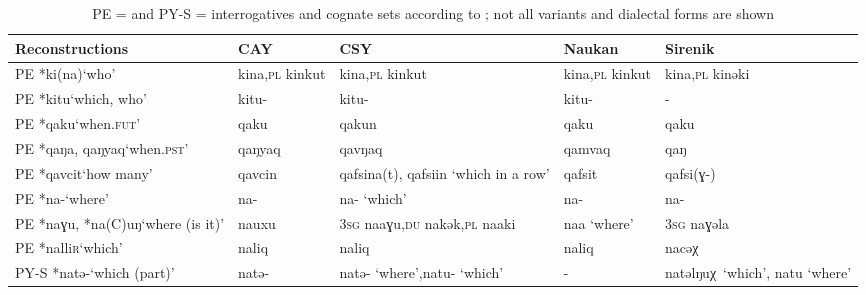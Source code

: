 \begin{table}
\caption{PE =  and PY-S =  interrogatives and cognate sets according to \cite[97, 98, 190, 223, 304, 310, 318]{FortescueJacobsonKaplan2010}; not all variants and dialectal forms are shown}
\label{tab:eska:7}

\begin{tabularx}{\textwidth}{QQQQQ}
\lsptoprule

\textbf{Reconstructions} & \textbf{CAY} & \textbf{CSY} & \textbf{Naukan} & \textbf{Sirenik}\\
\midrule
PE *ki(na)\newline ‘who’ & kina,\newline \textsc{pl} kinkut & kina,\newline \textsc{pl} kinkut & kina,\newline \textsc{pl} kinkut & kina,\newline \textsc{pl} kinəki\\
\tablevspace 
PE *kitu\newline ‘which, who’ & kitu- & kitu- & kitu- & -\\
\tablevspace 
PE *qaku\newline ‘when.\textsc{fut}’ & qaku & qakun & qaku & qaku\\
\tablevspace 
PE *qaŋa, qaŋyaq\newline ‘when.\textsc{pst}’ & qaŋyaq & qavŋaq & qamvaq & qaŋ\\
\tablevspace 
PE *qavcit\newline ‘how many’ & qavcin & qafsina(t), qafsiin ‘which in a row’ & qafsit & qafsi(ɣ-)\\
\tablevspace 
PE *na-\newline ‘where’ & na- & na- ‘which’ & na- & na-\\
\tablevspace 
PE *naɣu, *na(C)uŋ\newline ‘where (is it)’ & nauxu & 3\textsc{sg} naaɣu,\textsc{du} nakək,\textsc{pl} naaki & naa ‘where’ & 3\textsc{sg} naɣəla\\
\tablevspace 
PE *nalli\textsc{r}\newline ‘which’ & naliq & naliq & naliq & nacəχ\\
\tablevspace 
PY-S *natə-\newline ‘which (part)’ & natə- & natə- ‘where’,\newline natu- ‘which’ & - & \mbox{natəlŋuχ ‘which’}, natu ‘where’\\

\end{tabularx}
\end{table}
